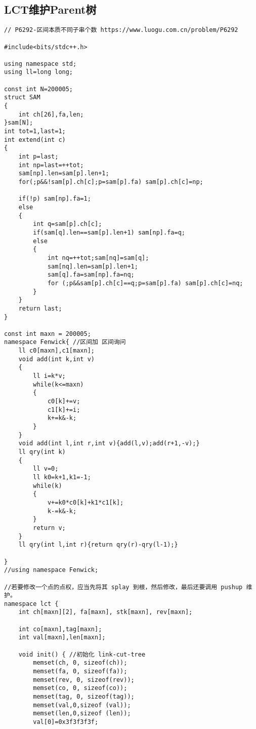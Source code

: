 \subsection{LCT维护Parent树}
\begin{verbatim}
// P6292-区间本质不同子串个数 https://www.luogu.com.cn/problem/P6292

#include<bits/stdc++.h>

using namespace std;
using ll=long long;

const int N=200005;
struct SAM
{
    int ch[26],fa,len;
}sam[N];
int tot=1,last=1;
int extend(int c)
{   
    int p=last;
    int np=last=++tot;
    sam[np].len=sam[p].len+1;
    for(;p&&!sam[p].ch[c];p=sam[p].fa) sam[p].ch[c]=np;

    if(!p) sam[np].fa=1;
    else
    {
        int q=sam[p].ch[c];
        if(sam[q].len==sam[p].len+1) sam[np].fa=q;
        else
        {
            int nq=++tot;sam[nq]=sam[q];
            sam[nq].len=sam[p].len+1;
            sam[q].fa=sam[np].fa=nq;
            for (;p&&sam[p].ch[c]==q;p=sam[p].fa) sam[p].ch[c]=nq;
        }
    } 
    return last;
}

const int maxn = 200005;
namespace Fenwick{ //区间加 区间询问
    ll c0[maxn],c1[maxn];
    void add(int k,int v)
    {
        ll i=k*v;
        while(k<=maxn)
        {
            c0[k]+=v;
            c1[k]+=i;
            k+=k&-k;
        }
    }
    void add(int l,int r,int v){add(l,v);add(r+1,-v);}
    ll qry(int k)
    {
        ll v=0;
        ll k0=k+1,k1=-1;
        while(k)
        {
            v+=k0*c0[k]+k1*c1[k];
            k-=k&-k;
        }
        return v;
    }
    ll qry(int l,int r){return qry(r)-qry(l-1);}

}
//using namespace Fenwick;

//若要修改一个点的点权，应当先将其 splay 到根，然后修改，最后还要调用 pushup 维护。
namespace lct {
    int ch[maxn][2], fa[maxn], stk[maxn], rev[maxn];

    int co[maxn],tag[maxn];
    int val[maxn],len[maxn];

    void init() { //初始化 link-cut-tree
        memset(ch, 0, sizeof(ch));
        memset(fa, 0, sizeof(fa));
        memset(rev, 0, sizeof(rev));
        memset(co, 0, sizeof(co));
        memset(tag, 0, sizeof(tag));
        memset(val,0,sizeof (val));
        memset(len,0,sizeof (len));
        val[0]=0x3f3f3f3f;


\end{verbatim}

